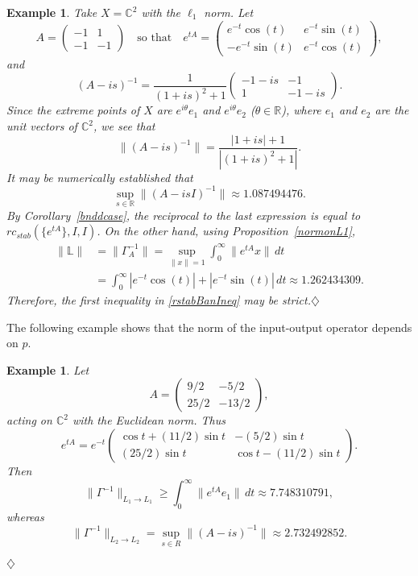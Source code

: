 \documentclass[10pt,psamsfonts,leqno]{siamltex}
\newtheorem{example}[prop]{Example}
\newcommand{\bbC}{\mathbb{C}}
\newcommand{\rcstab}{rc_{stab}}
\begin{document}
\begin{example}\label{StephenEx}{\em
Take $X = {\mathbb C}^2$ with the $\ell_1$ norm.  Let
$$ A = \begin{pmatrix}
-1 & 1 \\ -1 & -1
\end{pmatrix}\quad
\text{so that}\quad
 e^{tA} = \begin{pmatrix}
e^{-t} \cos(t) & e^{-t} \sin(t) \\
-e^{-t} \sin(t) & e^{-t} \cos(t)
\end{pmatrix},$$
and
$$ (A-is)^{-1} = \frac{1}{(1+is)^2 + 1}
   \begin{pmatrix}
 -1-is & -1 \\ 1 & -1-is
\end{pmatrix} .$$
Since the extreme points of $X$ are $e^{i\theta} e_1$ and
$e^{i\theta} e_2$ ($\theta \in {\mathbb R}$), where
$e_1$ and $e_2$ are the unit vectors of ${\mathbb C}^2$, we see that
$$ \|(A-is)^{-1}\| = \frac{|1+is| + 1}{|(1+is)^2 + 1|} .$$
It may be numerically established that
$$ \sup_{s\in{\mathbb R}} \|(A-isI)^{-1}\| \approx 1.087494476 .$$
By Corollary~\ref{bnddcase}, the reciprocal to the last expression is
equal to $\rcstab(\{e^{tA}\},I,I)$.
On the other hand, using Proposition~\ref{normonL1},
$$ \begin{aligned}
   \|{\mathbb L}\| & =\|\Gamma_A^{-1}\|
   = \sup_{\|x\| = 1}
   \int_0^\infty \|e^{tA} x\| \, dt \\
   &= \int_0^\infty |e^{-t} \cos(t)| + |e^{-t} \sin(t)| \, dt
   \approx 1.262434309 .
\end{aligned}$$
Therefore, the first inequality in \eqref{rstabBanIneq} may be
strict.\hfill$\diamondsuit$  }\end{example}

The following example shows that the norm of the input-output
operator depends on $p$.
\begin{example}\label{StephenEx2}{\em
Let
$$ A = \begin{pmatrix}
9/2 & -5/2 \\ 25/2 & -13/2 \end{pmatrix} ,$$
acting on $\bbC^2$ with the Euclidean norm.  Thus
$$ e^{t A} = e^{-t} \begin{pmatrix}
   \cos t + (11/2)\sin t & -(5/2)\sin t \\
   (25/2) \sin t & \cos t - (11/2) \sin t \end{pmatrix} .$$
Then
$$ \|\Gamma^{-1}\|_{L_1\to L_1} \ge
   \int_0^\infty \|e^{tA} e_1\| \, dt
   \approx 7.748310791 , $$
whereas
$$ \|\Gamma^{-1}\|_{L_2\to L_2} =
   \sup_{s \in R} \|(A-is)^{-1}\|
   \approx 2.732492852 .$$}

\vspace{-19.2pt}\hfill$\diamondsuit$\vspace{19.2pt}
\end{example}
\end{document}
